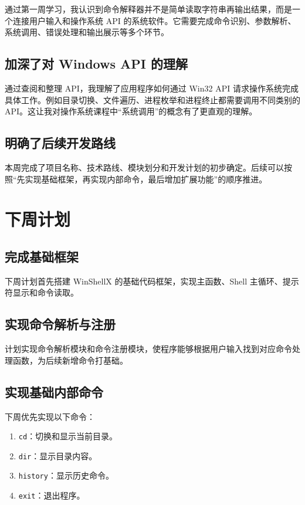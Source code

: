 \documentclass[UTF8]{ctexart}
\begin{document}
通过第一周学习，我认识到命令解释器并不是简单读取字符串再输出结果，而是一个连接用户输入和操作系统 API 的系统软件。它需要完成命令识别、参数解析、系统调用、错误处理和输出展示等多个环节。

\subsection{加深了对 Windows API 的理解}

通过查阅和整理 API，我理解了应用程序如何通过 Win32 API 请求操作系统完成具体工作。例如目录切换、文件遍历、进程枚举和进程终止都需要调用不同类别的 API。这让我对操作系统课程中“系统调用”的概念有了更直观的理解。

\subsection{明确了后续开发路线}

本周完成了项目名称、技术路线、模块划分和开发计划的初步确定。后续可以按照“先实现基础框架，再实现内部命令，最后增加扩展功能”的顺序推进。

\section{下周计划}

\subsection{完成基础框架}

下周计划首先搭建 WinShellX 的基础代码框架，实现主函数、Shell 主循环、提示符显示和命令读取。

\subsection{实现命令解析与注册}

计划实现命令解析模块和命令注册模块，使程序能够根据用户输入找到对应命令处理函数，为后续新增命令打基础。

\subsection{实现基础内部命令}

下周优先实现以下命令：

\begin{enumerate}
  \item \texttt{cd}：切换和显示当前目录。
  \item \texttt{dir}：显示目录内容。
  \item \texttt{history}：显示历史命令。
  \item \texttt{exit}：退出程序。
\end{enumerate}
\end{document}
